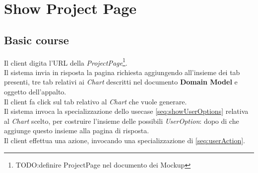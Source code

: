 \section{Show Project Page}
\label{seq:showProjectPage}
\subsection{Basic course}
Il client digita l'URL della \emph{ProjectPage}\footnote{TODO:definire
ProjectPage nel documento dei Mockup}. \\
Il sistema invia in risposta la pagina richiesta aggiungendo all'insieme dei
tab presenti, tre tab relativi ai \emph{Chart} descritti nel documento
\textbf{Domain Model} e oggetto dell'appalto.\\
Il client fa click sul tab relativo al \emph{Chart} che vuole generare.\\
Il sistema invoca la specializzazione dello usecase \ref{seq:showUserOptions}
relativa al \emph{Chart} scelto, per costruire l'insieme delle possibili
\emph{UserOption}: dopo di che aggiunge questo insieme alla pagina di
risposta.\\
Il client effettua una azione, invocando una specializzazione di
\ref{seq:userAction}.